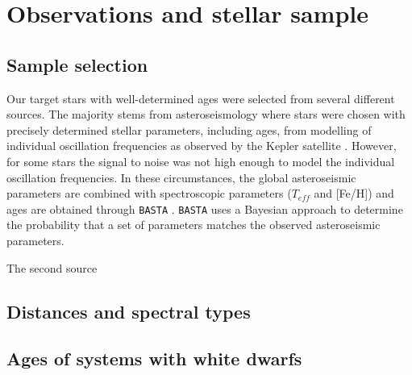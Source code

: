 \section{Observations and stellar sample}
\subsection{Sample selection}
Our target stars with well-determined ages were selected from several different sources. The majority stems from asteroseismology where stars were chosen with precisely determined stellar parameters, including ages, from modelling of individual oscillation frequencies as observed by the Kepler satellite \citep{Silva_Aguirre_etal_2015,Silva_Aguirre_etal_2017}. However, for some stars the signal to noise was not high enough to model the individual oscillation frequencies. In these circumstances, the global asteroseismic parameters \citep{Chaplin_etal_2014} are combined with spectroscopic parameters ($T_{eff}$ and [Fe/H]) and ages are obtained through \texttt{BASTA} \citep{Silva_Aguirre_etal_2015}. \texttt{BASTA} uses a Bayesian approach to determine the probability that a set of parameters matches the observed asteroseismic parameters.

The second source



\subsection{Distances and spectral types}

\subsection{Ages of systems with white dwarfs}






































\newpage